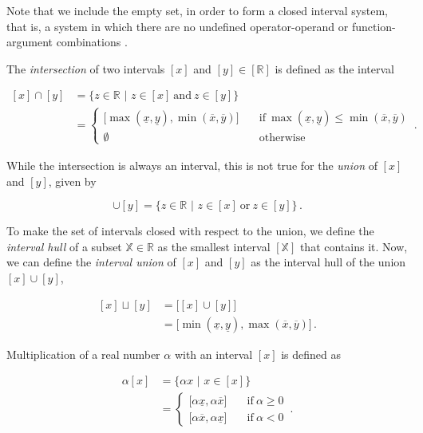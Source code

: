  \noindent
Note that we include the empty set, in order to form a closed interval system, that is, a system in which there are no undefined operator-operand or function-argument combinations \cite{hansen2003global}.

The \emph{intersection} of two intervals $[x]$ and $[y] \in [\mathbb{R}]$ is defined as the interval

 \begin{equation}
 \begin{split}
  [x] \cap [y] &= \big\{ z \in \mathbb{R}\,\,|\,\, z \in [x] \:\mbox{and}\: z \in [y] \big\} \\
  &= \begin{cases}
  	\big[\max(\underline{x}, \underline{y}), \min(\overline{x}, \overline{y})\big] & \quad \mathrm{if}\:\max(\underline{x}, \underline{y}) \leq \min(\overline{x}, \overline{y}) \\
  	\emptyset & \quad \mathrm{otherwise}
  \end{cases}\,.
\end{split}
\end{equation}

\noindent
While the intersection is always an interval, this is not true for the \emph{union} of $[x]$ and $[y]$, given by

 \begin{equation}
  [x] \cup [y] = \big\{ z \in \mathbb{R}\,\,|\,\, z \in [x] \:\mbox{or}\: z \in [y] \big\} \,.
  \end{equation}

\noindent
To make the set of intervals closed with respect to the union, we define the \emph{interval hull} of a subset $\mathbb{X} \in \mathbb{R}$ as the smallest interval $[\mathbb{X}]$ that contains it. Now, we can define the \emph{interval union} of $[x]$ and $[y]$ as the interval hull of the union $[x] \cup [y]$,

 \begin{equation}
  \begin{split}
  [x] \sqcup [y] &= \big[[x] \cup [y]\big] \\
  &= \big[\min(\underline{x}, \underline{y}), \max(\overline{x}, \overline{y})\big]\,.
  \end{split}
  \end{equation}

Multiplication of a real number $\alpha$ with an interval $[x]$ is defined as

 \begin{equation}
 \begin{split}
  \alpha[x] &= \big\{ \alpha x \,\,|\,\, x \in [x]\big\} \\
  &= \begin{cases}
  	\big[\alpha\underline{x}, \alpha\overline{x}\big] & \quad \mathrm{if}\:\alpha \geq 0 \\
  	\big[\alpha\overline{x}, \alpha\underline{x}\big] & \quad \mathrm{if}\:\alpha < 0
  \end{cases}\,.
\end{split}
\end{equation}

